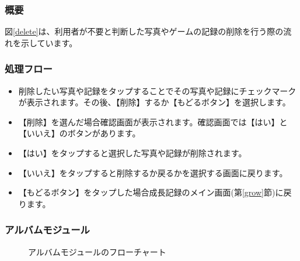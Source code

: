 \documentclass[a4j]{jarticle}
\begin{document}
\subsubsection*{概要}
図\ref{delete}は、利用者が不要と判断した写真やゲームの記録の削除を行う際の流れを示しています。

\subsubsection*{処理フロー}
\begin{itemize}
\item 削除したい写真や記録をタップすることでその写真や記録にチェックマークが表示されます。その後、【削除】するか【もどるボタン】を選択します。
\item 【削除】を選んだ場合確認画面が表示されます。確認画面では【はい】と【いいえ】のボタンがあります。
\item 【はい】をタップすると選択した写真や記録が削除されます。
\item 【いいえ】をタップすると削除するか戻るかを選択する画面に戻ります。
\item 【もどるボタン】をタップした場合成長記録のメイン画面(第\ref{grow}節)に戻ります。
\end{itemize}

\subsubsection{アルバムモジュール\label{Albam}}
\begin{figure}[H]
    \begin{center}
    \caption {アルバムモジュールのフローチャート}
    \label{albam}
    \end{center}
\end{figure}
\end{document}
